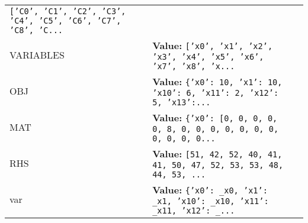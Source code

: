 \begin{longtable}{|p{\varnamewidth}|p{\vardescrwidth}|l}
{\tt \texttt{[}\texttt{'}\texttt{C0}\texttt{'}\texttt{, }\texttt{'}\texttt{C1}\texttt{'}\texttt{, }\texttt{'}\texttt{C2}\texttt{'}\texttt{, }\texttt{'}\texttt{C3}\texttt{'}\texttt{, }\texttt{'}\texttt{C4}\texttt{'}\texttt{, }\texttt{'}\texttt{C5}\texttt{'}\texttt{, }\texttt{'}\texttt{C6}\texttt{'}\texttt{, }\texttt{'}\texttt{C7}\texttt{'}\texttt{, }\texttt{'}\texttt{C8}\texttt{'}\texttt{, }\texttt{'}\texttt{C}\texttt{...}}&\\
\cline{1-2}
\raggedright V\-A\-R\-I\-A\-B\-L\-E\-S\- & \raggedright \textbf{Value:} 
{\tt \texttt{[}\texttt{'}\texttt{x0}\texttt{'}\texttt{, }\texttt{'}\texttt{x1}\texttt{'}\texttt{, }\texttt{'}\texttt{x2}\texttt{'}\texttt{, }\texttt{'}\texttt{x3}\texttt{'}\texttt{, }\texttt{'}\texttt{x4}\texttt{'}\texttt{, }\texttt{'}\texttt{x5}\texttt{'}\texttt{, }\texttt{'}\texttt{x6}\texttt{'}\texttt{, }\texttt{'}\texttt{x7}\texttt{'}\texttt{, }\texttt{'}\texttt{x8}\texttt{'}\texttt{, }\texttt{'}\texttt{x}\texttt{...}}&\\
\cline{1-2}
\raggedright O\-B\-J\- & \raggedright \textbf{Value:} 
{\tt \texttt{\{}\texttt{'}\texttt{x0}\texttt{'}\texttt{: }10\texttt{, }\texttt{'}\texttt{x1}\texttt{'}\texttt{: }10\texttt{, }\texttt{'}\texttt{x10}\texttt{'}\texttt{: }6\texttt{, }\texttt{'}\texttt{x11}\texttt{'}\texttt{: }2\texttt{, }\texttt{'}\texttt{x12}\texttt{'}\texttt{: }5\texttt{, }\texttt{'}\texttt{x13}\texttt{'}\texttt{:}\texttt{...}}&\\
\cline{1-2}
\raggedright M\-A\-T\- & \raggedright \textbf{Value:} 
{\tt \texttt{\{}\texttt{'}\texttt{x0}\texttt{'}\texttt{: }\texttt{[}0\texttt{, }0\texttt{, }0\texttt{, }0\texttt{, }0\texttt{, }8\texttt{, }0\texttt{, }0\texttt{, }0\texttt{, }0\texttt{, }0\texttt{, }0\texttt{, }0\texttt{, }0\texttt{, }0\texttt{, }0\texttt{, }0\texttt{...}}&\\
\cline{1-2}
\raggedright R\-H\-S\- & \raggedright \textbf{Value:} 
{\tt \texttt{[}51\texttt{, }42\texttt{, }52\texttt{, }40\texttt{, }41\texttt{, }41\texttt{, }50\texttt{, }47\texttt{, }52\texttt{, }53\texttt{, }53\texttt{, }48\texttt{, }44\texttt{, }53\texttt{, }\texttt{...}}&\\
\cline{1-2}
\raggedright v\-a\-r\- & \raggedright \textbf{Value:} 
{\tt \texttt{\{}\texttt{'}\texttt{x0}\texttt{'}\texttt{: }\_x0\texttt{, }\texttt{'}\texttt{x1}\texttt{'}\texttt{: }\_x1\texttt{, }\texttt{'}\texttt{x10}\texttt{'}\texttt{: }\_x10\texttt{, }\texttt{'}\texttt{x11}\texttt{'}\texttt{: }\_x11\texttt{, }\texttt{'}\texttt{x12}\texttt{'}\texttt{: }\_\texttt{...}}&\\

\end{longtable}
